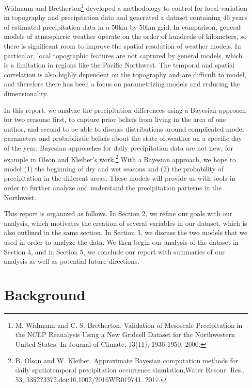 \documentclass{article}
\begin{document}
Widmann and Bretherton\footnote{M. Widmann and C. S. Bretherton. Validation of Mesoscale Precipitation in the NCEP Reanalysis Using a New Gridcell Dataset for the Northwestern United States. In Journal of Climate, 13(11), 1936-1950. 2000.} developed a methodology to control for local variation in topography and precipitation data and generated a dataset containing 46 years of estimated precipitation data in a 50km by 50km grid.  In comparison, general models of atmospheric weather operate on the order of hundreds of kilometers, so there is significant room to improve the spatial resolution of weather models.  In particular, local topographic features are not captured by general models, which is a limitation in regions like the Pacific Northwest. The temporal and spatial correlation is also highly dependent on the topography and are difficult to model, and therefore there has been a focus on parametrizing models and reducing the dimensionality. 

In this report, we analyze the precipitation differences using a Bayesian approach for two reasons: first, to capture prior beliefs  from living in the area of one author, and second to be able to discuss distributions around complicated model parameters and probabilistic beliefs about the state of weather on a specific day of the year. Bayesian approaches for daily precipitation data are not new, for example in Olson and Kleiber's work.\footnote{B. Olson and W. Kleiber. Approximate Bayesian computation methods for daily spatiotemporal precipitation occurrence simulation,Water Resour. Res., 53, 3352?3372,doi:10.1002/2016WR019741. 2017.} With a Bayesian approach, we hope to model (1) the beginning of dry and wet seasons and (2) the probability of precipitation in the different areas. These models will provide us with tools in order to further analyze and understand the precipitation patterns in the Northwest. 

This report is organized as follows. In Section 2, we refine our goals with our analysis, which motivates the creation of several variables in our dataset, which is also outlined in the same section. In Section 3, we discuss the two models that we used in order to analyze the data.  We then begin our analysis of the dataset in Section 4, and in Section 5, we conclude our report with summaries of our analysis as well as potential future directions.

\section{Background}
\end{document}
